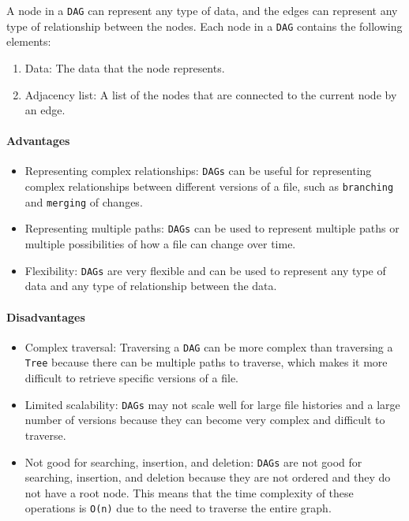 A node in a \lstinline{DAG} can represent any type of data, and the edges can represent any type of relationship between the nodes. Each node in a \lstinline{DAG} contains the following elements:
\begin{enumerate}
    \item Data: The data that the node represents.
    \item Adjacency list: A list of the nodes that are connected to the current node by an edge.
\end{enumerate}



\paragraph{Advantages}
\begin{itemize}
    \item Representing complex relationships: \lstinline{DAGs} can be useful for representing complex relationships between different versions of a file, such as \lstinline{branching} and \lstinline{merging} of changes.
    \item Representing multiple paths: \lstinline{DAGs} can be used to represent multiple paths or multiple possibilities of how a file can change over time.
    \item Flexibility: \lstinline{DAGs} are very flexible and can be used to represent any type of data and any type of relationship between the data.
\end{itemize}
\paragraph{Disadvantages}
\begin{itemize}
    \item Complex traversal: Traversing a \lstinline{DAG} can be more complex than traversing a \lstinline{Tree} because there can be multiple paths to traverse, which makes it more difficult to retrieve specific versions of a file.
    \item Limited scalability: \lstinline{DAGs} may not scale well for large file histories and a large number of versions because they can become very complex and difficult to traverse.
    \item Not good for searching, insertion, and deletion: \lstinline{DAGs} are not good for searching, insertion, and deletion because they are not ordered and they do not have a root node. This means that the time complexity of these operations is \lstinline{O(n)} due to the need to traverse the entire graph.
\end{itemize}

